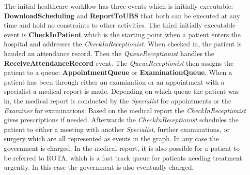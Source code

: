 The initial healthcare workflow has three events which is initially executable: \textbf{DownloadScheduling} and \textbf{ReportToUBS} that both can be executed at any time and hold no constraints to other activities. The third initially executable event is \textbf{CheckInPatient} which is the starting point when a patient enters the hospital and addresses the \textit{CheckInReceptionist}. When checked in, the patient is handed an attendance record. Then the \textit{QueueReceptionist} handles the \textbf{ReceiveAttendanceRecord} event. The \textit{QueueReceptionist} then assigns the patient to a queue: \textbf{AppointmentQueue} or \textbf{ExaminationQueue}. When a patient has been through either an examination or an appointment with a specialist a medical report is made. Depending on which queue the patient was in, the medical report is conducted by the \textit{Specialist} for appointments or the \textit{Examiner} for examinations. Based on the medical report the \textit{CheckInReceptionist} gives prescriptions if needed. Afterwards the \textit{CheckInReceptionist} schedules the patient to either a meeting with another \textit{Specialist}, further examinations, or surgery which are all represented as events in the graph. In any case the government is charged. In the medical report, it is also possible for a patient to be referred to ROTA, which is a fast track queue for patients needing treatment urgently. In this case the government is also eventually charged.